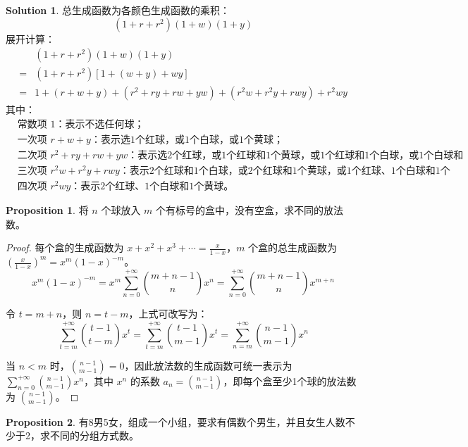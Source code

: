 \documentclass[oneside]{book}
\theoremstyle{definition}
\newtheorem{proposition}{Proposition}[section]
\newtheorem*{sol}{Solution}
\begin{document}
\begin{sol}
	总生成函数为各颜色生成函数的乘积：
	\[
	(1 + r + r^2)(1 + w)(1 + y)
	\]
	展开计算：
	\[
	\begin{aligned}
		&(1 + r + r^2)(1 + w)(1 + y) \\
		=& (1 + r + r^2)\left[ 1 + (w + y) + wy \right] \\
		=& 1 + (r + w + y) + (r^2 + ry + rw + yw) + (r^2 w + r^2 y + rwy) + r^2 wy
	\end{aligned}
	\]
	其中：
\[\begin{aligned}
	&\text{常数项 } 1\text{：表示不选任何球；} \\
	&\text{一次项 } r + w + y\text{：表示选1个红球，或1个白球，或1个黄球；} \\
	&\text{二次项 } r^2 + ry + rw + yw\text{：表示选2个红球，或1个红球和1个黄球，或1个红球和1个白球，或1个白球和1个黄球；} \\
	&\text{三次项 } r^2 w + r^2 y + rwy\text{：表示2个红球和1个白球，或2个红球和1个黄球，或1个红球、1个白球和1个黄球；} \\
	&\text{四次项 } r^2 wy\text{：表示2个红球、1个白球和1个黄球。}
\end{aligned}\]
	
\end{sol}
\begin{proposition}
	将 \( n \) 个球放入 \( m \) 个有标号的盒中，没有空盒，求不同的放法数。
\end{proposition}

\begin{proof}
	每个盒的生成函数为 \( x + x^2 + x^3 + \cdots = \frac{x}{1 - x} \)，\( m \) 个盒的总生成函数为 \( \left( \frac{x}{1 - x} \right)^m = x^m (1 - x)^{-m} \)。
	\[
	x^m (1 - x)^{-m} = x^m \sum_{n=0}^{+\infty} \binom{m + n - 1}{n} x^n = \sum_{n=0}^{+\infty} \binom{m + n - 1}{n} x^{m + n}
	\]
	
	令 \( t = m + n \)，则 \( n = t - m \)，上式可改写为：
	\[
	\sum_{t=m}^{+\infty} \binom{t - 1}{t - m} x^t = \sum_{t=m}^{+\infty} \binom{t - 1}{m - 1} x^t = \sum_{n=m}^{+\infty} \binom{n - 1}{m - 1} x^n
	\]
	
	当 \( n < m \) 时，\( \binom{n - 1}{m - 1} = 0 \)，因此放法数的生成函数可统一表示为 \( \sum_{n=0}^{+\infty} \binom{n - 1}{m - 1} x^n \)，其中 \( x^n \) 的系数 \( a_n = \binom{n - 1}{m - 1} \)，即每个盒至少1个球的放法数为 \( \binom{n - 1}{m - 1} \)。
\end{proof}

\begin{proposition}
	有8男5女，组成一个小组，要求有偶数个男生，并且女生人数不少于2，求不同的分组方式数。
\end{proposition}
\end{document}
